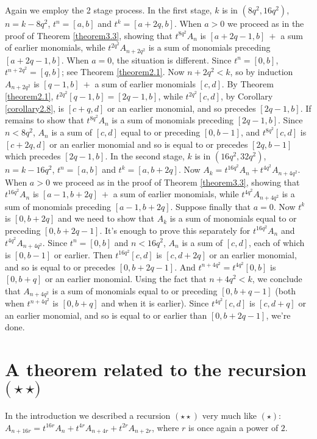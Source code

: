 \documentclass{monsky2009}
\begin{document}
Again we employ the 2 stage process. In the first stage, $k$ is in $(8q^{2}, 16q^{2})$, $n=k-8q^{2}$, $t^{n}=[a,b]$ and  $t^{k}=[a+2q, b]$.  When $a>0$ we proceed as in the proof of Theorem \ref{theorem3.3}, showing that $t^{8q^{2}}A_{n}$ is $[a+2q-1,b]\ +$ a sum of earlier monomials, while $t^{2q^{2}}A_{n+2q^{2}}$ is a sum of monomials preceding $[a+2q-1,b]$. When $a=0$, the situation is different. Since $t^{n}=[0,b]$, $t^{n+2q^{2}}=[q,b]$; see Theorem \ref{theorem2.1}. Now $n+2q^{2}<k$, so by induction $A_{n+2q^{2}}$ is $[q-1,b]\ +$ a sum of earlier monomials $[c,d]$. By Theorem \ref{theorem2.1}, $t^{2q^{2}}[q-1,b]=[2q-1,b]$, while $t^{2q^{2}}[c,d]$, by Corollary \ref{corollary2.8}, is $[c+q,d]$ or an earlier monomial, and so precedes $[2q-1,b]$. If remains to show that $t^{8q^{2}}A_{n}$ is a sum of monomials preceding $[2q-1,b]$. Since $n<8q^{2}$, $A_{n}$ is a sum of $[c,d]$ equal to or preceding $[0,b-1]$, and $t^{8q^{2}}[c,d]$ is $[c+2q,d]$ or an earlier monomial and so is equal to or precedes $[2q,b-1]$ which precedes $[2q-1,b]$. In the second stage, $k$ is in $(16q^{2}, 32q^{2})$, $n=k-16q^{2}$, $t^{n}=[a,b]$ and $t^{k}=[a,b+2q]$.  Now $A_{k}=t^{16q^{2}}A_{n}+t^{4q^{2}}A_{n+4q^{2}}$. When $a>0$ we proceed as in the proof of Theorem \ref{theorem3.3}, showing that $t^{16q^{2}}A_{n}$ is $[a-1,b+2q]\ +$ a sum of earlier monomials, while $t^{4q^{2}}A_{n+4q^{2}}$ is a sum of monomials preceding $[a-1,b+2q]$. Suppose finally that $a=0$. Now $t^{k}$ is $[0,b+2q]$ and we need to show that $A_{k}$ is a sum of monomials equal to or preceding $[0,b+2q-1]$.  It's enough to prove this separately for $t^{16q^{2}}A_{n}$ and $t^{4q^{2}}A_{n+4q^{2}}$. Since $t^{n}=[0,b]$ and $n<16q^{2}$, $A_{n}$ is a sum of $[c,d]$, each of which is $[0,b-1]$ or earlier. Then $t^{16q^{2}}[c,d]$ is $[c,d+2q]$ or an earlier monomial, and so is equal to or precedes $[0,b+2q-1]$. And $t^{n+4q^{2}}=t^{4q^{2}}[0,b]$ is $[0,b+q]$ or an earlier monomial. Using the fact that $n+4q^{2}<k$, we conclude that $A_{n+4q^{2}}$ is a sum of monomials equal to or preceding $[0,b+q-1]$ (both when $t^{n+4q^{2}}$ is $[0,b+q]$ and when it is earlier). Since $t^{4q^{2}}[c,d]$ is $[c,d+q]$ or an earlier monomial, and so is equal to or earlier than $[0,b+2q-1]$, we're done.

\section{A theorem related to the recursion $\bm (\star\star)$}
\label{section4}

In the introduction we described a recursion $(\star\star)$ very much like $(\star)$: $A_{n+16r} = t^{16r}A_{n}+t^{4r}A_{n+4r}+t^{2r}A_{n+2r}$, where $r$ is once again a power of $2$.
\end{document}
